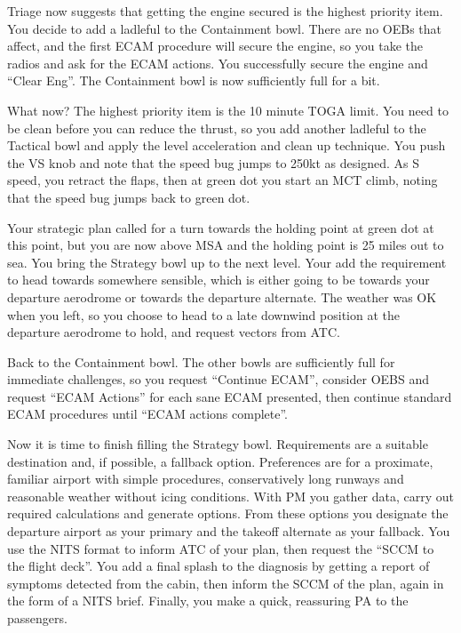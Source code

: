 \documentclass[a5paper,11pt,titlepage]{article}
\begin{document}
Triage now suggests that getting the engine secured is the highest
priority item. You decide to add a ladleful to the Containment
bowl. There are no OEBs that affect, and the first ECAM procedure will
secure the engine, so you take the radios and ask for the ECAM
actions. You successfully secure the engine and ``Clear Eng''. The
Containment bowl is now sufficiently full for a bit.

What now? The highest priority item is the 10 minute TOGA limit. You
need to be clean before you can reduce the thrust, so you add another
ladleful to the Tactical bowl and apply the level acceleration and
clean up technique. You push the VS knob and note that the speed bug
jumps to 250kt as designed. As S speed, you retract the flaps, then at
green dot you start an MCT climb, noting that the speed bug jumps back
to green dot.

Your strategic plan called for a turn towards the holding point at green
dot at this point, but you are now above MSA and the holding point is 25
miles out to sea. You bring the Strategy bowl up to the next level. Your
add the requirement to head towards somewhere sensible, which is either
going to be towards your departure aerodrome or towards the departure
alternate. The weather was OK when you left, so you choose to head to a
late downwind position at the departure aerodrome to hold, and request
vectors from ATC.

Back to the Containment bowl. The other bowls are sufficiently full for
immediate challenges, so you request ``Continue ECAM'', consider OEBS
and request ``ECAM Actions'' for each sane ECAM presented, then continue
standard ECAM procedures until ``ECAM actions complete''.

Now it is time to finish filling the Strategy bowl. Requirements are a
suitable destination and, if possible, a fallback option. Preferences
are for a proximate, familiar airport with simple procedures,
conservatively long runways and reasonable weather without icing
conditions. With PM you gather data, carry out required calculations and
generate options. From these options you designate the departure airport
as your primary and the takeoff alternate as your fallback. You use the
NITS format to inform ATC of your plan, then request the ``SCCM to the
flight deck''. You add a final splash to the diagnosis by getting a
report of symptoms detected from the cabin, then inform the SCCM of the
plan, again in the form of a NITS brief. Finally, you make a quick,
reassuring PA to the passengers.
\end{document}

